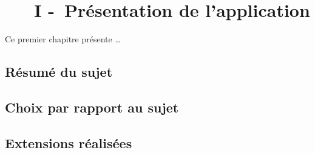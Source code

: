 \chapter[~~~PRÉSENTATION DE L'APPLICATION]{~~~I -~Présentation de l'application}%
\label{refDev1}%

Ce premier chapitre présente \dots

\section{Résumé du sujet}

\section{Choix par rapport au sujet}

\section{Extensions réalisées}




